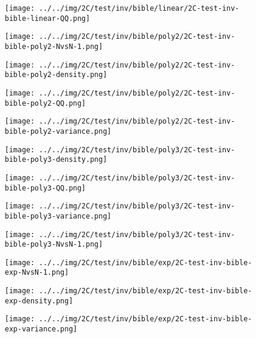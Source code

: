 \begin{figure}[H]
\centering	\texttt{[image: ../../img/2C/test/inv/bible/linear/2C-test-inv-bible-linear-QQ.png]}
\end{figure}
\begin{figure}[H]
\centering	\texttt{[image: ../../img/2C/test/inv/bible/poly2/2C-test-inv-bible-poly2-NvsN-1.png]}
\end{figure}
\begin{figure}[H]
\centering	\texttt{[image: ../../img/2C/test/inv/bible/poly2/2C-test-inv-bible-poly2-density.png]}
\end{figure}
\begin{figure}[H]
\centering	\texttt{[image: ../../img/2C/test/inv/bible/poly2/2C-test-inv-bible-poly2-QQ.png]}
\end{figure}
\begin{figure}[H]
\centering	\texttt{[image: ../../img/2C/test/inv/bible/poly2/2C-test-inv-bible-poly2-variance.png]}
\end{figure}
\begin{figure}[H]
\centering	\texttt{[image: ../../img/2C/test/inv/bible/poly3/2C-test-inv-bible-poly3-density.png]}
\end{figure}
\begin{figure}[H]
\centering	\texttt{[image: ../../img/2C/test/inv/bible/poly3/2C-test-inv-bible-poly3-QQ.png]}
\end{figure}
\begin{figure}[H]
\centering	\texttt{[image: ../../img/2C/test/inv/bible/poly3/2C-test-inv-bible-poly3-variance.png]}
\end{figure}
\begin{figure}[H]
\centering	\texttt{[image: ../../img/2C/test/inv/bible/poly3/2C-test-inv-bible-poly3-NvsN-1.png]}
\end{figure}
\begin{figure}[H]
\centering	\texttt{[image: ../../img/2C/test/inv/bible/exp/2C-test-inv-bible-exp-NvsN-1.png]}
\end{figure}
\begin{figure}[H]
\centering	\texttt{[image: ../../img/2C/test/inv/bible/exp/2C-test-inv-bible-exp-density.png]}
\end{figure}
\begin{figure}[H]
\centering	\texttt{[image: ../../img/2C/test/inv/bible/exp/2C-test-inv-bible-exp-variance.png]}
\end{figure}
